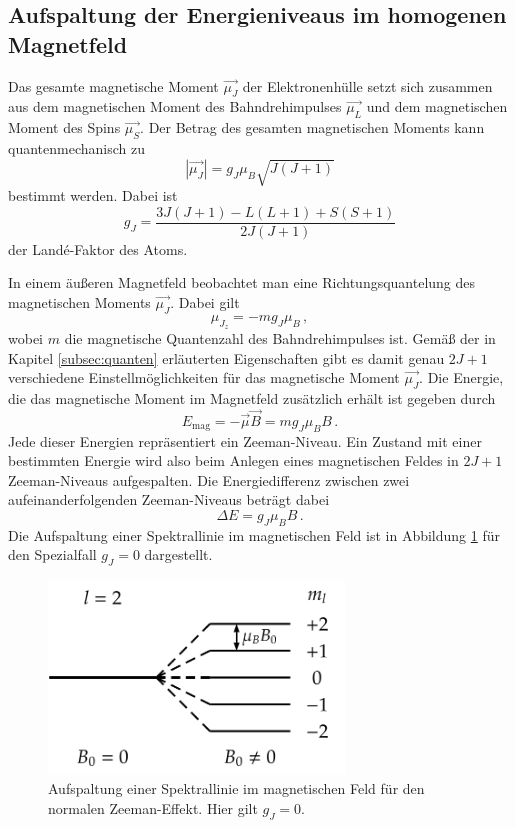 \subsection{Aufspaltung der Energieniveaus im homogenen Magnetfeld}

Das gesamte magnetische Moment $\vec{\mu_J}$ der Elektronenhülle setzt sich
zusammen aus dem magnetischen Moment des Bahndrehimpulses $\vec{\mu_L}$ und
dem magnetischen Moment des Spins $\vec{\mu_S}$. Der Betrag des gesamten
magnetischen Moments kann quantenmechanisch zu
\begin{equation}
  |\vec{\mu_J}| = g_J \mu_B \sqrt{J(J+1)}
\end{equation}
bestimmt werden. Dabei ist
\begin{equation}
  g_J = \frac{3J(J+1)-L(L+1)+S(S+1)}{2J(J+1)}
  \label{eqn:lande}
\end{equation}
der Landé-Faktor des Atoms.

In einem äußeren Magnetfeld beobachtet man eine Richtungsquantelung des magnetischen
Moments $\vec{\mu_J}$. Dabei gilt
\begin{equation}
  \mu_{J_z} = -m g_J \mu_B \,,
\end{equation}
wobei $m$ die magnetische Quantenzahl des Bahndrehimpulses ist. Gemäß der in Kapitel
\ref{subsec:quanten} erläuterten Eigenschaften gibt es damit genau $2J+1$ verschiedene
Einstellmöglichkeiten für das magnetische Moment $\vec{\mu_J}$.
Die Energie, die das magnetische Moment im Magnetfeld zusätzlich erhält ist
gegeben durch
\begin{equation}
    E_\text{mag} =-\vec{\mu} \vec{B} = m g_J \mu_B B\,.
\end{equation}
Jede dieser Energien repräsentiert ein Zeeman-Niveau. Ein Zustand mit einer
bestimmten Energie wird also beim Anlegen eines magnetischen Feldes in $2J+1$
Zeeman-Niveaus aufgespalten.
Die Energiedifferenz zwischen zwei aufeinanderfolgenden Zeeman-Niveaus beträgt dabei
\begin{equation}
  \Delta E=g_J \mu_B B\,.
\end{equation}
Die Aufspaltung einer Spektrallinie im magnetischen Feld ist in Abbildung \ref{fig:aufspaltung}
für den Spezialfall $g_J=0$ dargestellt.

\begin{figure}
  \centering
  \includegraphics[width=0.7\textwidth]{data/aufspaltung.png}
  \caption{Aufspaltung einer Spektrallinie im magnetischen Feld für den normalen Zeeman-Effekt. Hier gilt
  $g_J=0$. \cite{aufspaltung}}
  \label{fig:aufspaltung}
\end{figure}

